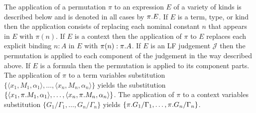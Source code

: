\begin{definition}%
The application of a permutation $\pi$ to an expression $E$ of a
variety of kinds is described below and is denoted in all cases by
${\pi}.{E}$.
%
If $E$ is a term, type, or kind then the
application consists of replacing each nominal constant $n$ that
appears in $E$ with $\pi(n)$. 
%
If $E$ is a context then the application of $\pi$ to $E$
replaces each explicit binding $n:A$ in $E$ with 
$\pi(n):{\pi}.{A}$.
%
If $E$ is an LF judgement $\mathcal{J}$ then the permutation is applied
to each component of the judgement in the way described above.
%
If $E$ is a formula then the permutation is applied to its component parts.
%
The application of $\pi$ to a term variables substitution
$\{\langle x_1,M_1,\alpha_1\rangle,\ldots,
   \langle x_n,M_n,\alpha_n\rangle\}$
yields the substitution 
$\{\langle x_1,{\pi}.{M_1},\alpha_1\rangle,\ldots,
   \langle x_n,{\pi}.{M_n},\alpha_n\rangle\}$.
%
The application of $\pi$ to a context variables substitution
$\{G_1/\Gamma_1,\ldots, G_n/\Gamma_n\}$ yields
$\{{\pi}.{G_1}/\Gamma_1,\ldots, {\pi}.{G_n}/\Gamma_n\}$.
\end{definition}

